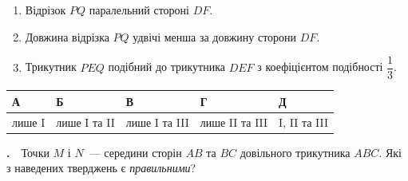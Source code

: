 \documentclass[12pt]{article}
\newcommand{\answerTable}[5]{%
\par\vspace{0.15cm}
\noindent
\begin{tabular}{|*{5}{>{\centering\arraybackslash}m{3cm}|}}
\hline
\rule[-0.15cm]{0pt}{0.6cm}\textbf{А} & \rule[-0.15cm]{0pt}{0.6cm}\textbf{Б} & \rule[-0.15cm]{0pt}{0.6cm}\textbf{В} & \rule[-0.15cm]{0pt}{0.6cm}\textbf{Г} & \rule[-0.15cm]{0pt}{0.6cm}\textbf{Д} \\
\hline
\rule[-0.2cm]{0pt}{0.75cm}#1 & \rule[-0.2cm]{0pt}{0.75cm}#2 & \rule[-0.2cm]{0pt}{0.75cm}#3 & \rule[-0.2cm]{0pt}{0.75cm}#4 & \rule[-0.2cm]{0pt}{0.75cm}#5 \\
\hline
\end{tabular}
\par\vspace{0.25cm}
}
\newcounter{zad}
\newcommand{\zadnum}{\stepcounter{zad}\textbf{\thezad.}\ \ }
\newcounter{ans}
\begin{document}
\vspace{0.1cm}
\begin{enumerate}[label=\textbf{\Roman*.}, align=left, leftmargin=2.6em, labelsep=0.5em, itemsep=0.08cm, topsep=0.06cm]
\item Відрізок $PQ$ паралельний стороні $DF$.
\item Довжина відрізка $PQ$ удвічі менша за довжину сторони $DF$.
\item Трикутник $PEQ$ подібний до трикутника $DEF$ з коефіцієнтом подібності $\dfrac{1}{3}$.
\end{enumerate}
\vspace{0.1cm}
\answerTable{лише I}{лише I та II}{лише I та III}{лише II та III}{I, II та III}
\zadnum Точки $M$ і $N$~--- середини сторін $AB$ та $BC$ довільного трикутника $ABC$. Які з наведених тверджень є \textit{правильними}?
\end{document}
